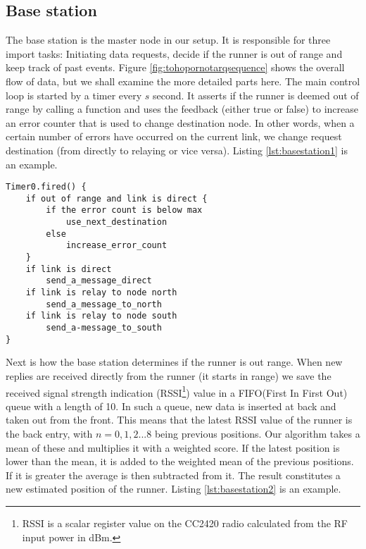 \subsection{Base station}\label{sc:basestation}

The base station is the master node in our setup. It is responsible for three import tasks: Initiating data requests, decide if the runner is out of range and keep track of past events. Figure \ref{fig:tohopornotarqsequence} shows the overall flow of data, but we shall examine the more detailed parts here. The main control loop is started by a timer every $s$ second. It asserts if the runner is deemed out of range by calling a function and uses the feedback (either true or false) to increase an error counter that is used to change destination node. In other words, when a certain number of errors have occurred on the current link, we change request destination (from directly to relaying or vice versa). Listing \ref{lst:basestation1} is an example.
\noindent
\begin{minipage}[t]{0.95\linewidth}
	\begin{lstlisting}[caption=Main control loop of base station., label={lst:basestation1}]
Timer0.fired() {
	if out of range and link is direct {
		if the error count is below max
			use_next_destination
		else
			increase_error_count
	}
	if link is direct
		send_a_message_direct
	if link is relay to node north
		send_a_message_to_north
	if link is relay to node south
		send_a-message_to_south
}
	\end{lstlisting}
\end{minipage}

\noindent Next is how the base station determines if the runner is out range. When new replies are received directly from the runner (it starts in range) we save the received signal strength indication (RSSI\footnote{RSSI is a scalar register value on the CC2420 radio calculated from the RF input power in dBm.}) value in a FIFO(First In First Out) queue with a length of 10. In such a queue, new data is inserted at back and taken out from the front. This means that the latest RSSI value of the runner is the back entry, with $n=0,1,2 ... 8$ being previous positions. Our algorithm takes a mean of these and multiplies it with a weighted score. If the latest position is lower than the mean, it is added to the weighted mean of the previous positions. If it is greater the average is then subtracted from it. The result constitutes a new estimated position of the runner. Listing \ref{lst:basestation2} is an example.

